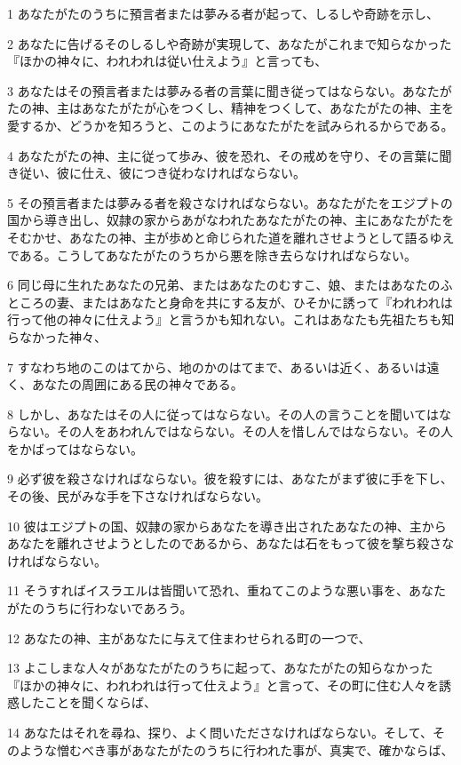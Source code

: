 \par 1 あなたがたのうちに預言者または夢みる者が起って、しるしや奇跡を示し、
\par 2 あなたに告げるそのしるしや奇跡が実現して、あなたがこれまで知らなかった『ほかの神々に、われわれは従い仕えよう』と言っても、
\par 3 あなたはその預言者または夢みる者の言葉に聞き従ってはならない。あなたがたの神、主はあなたがたが心をつくし、精神をつくして、あなたがたの神、主を愛するか、どうかを知ろうと、このようにあなたがたを試みられるからである。
\par 4 あなたがたの神、主に従って歩み、彼を恐れ、その戒めを守り、その言葉に聞き従い、彼に仕え、彼につき従わなければならない。
\par 5 その預言者または夢みる者を殺さなければならない。あなたがたをエジプトの国から導き出し、奴隷の家からあがなわれたあなたがたの神、主にあなたがたをそむかせ、あなたの神、主が歩めと命じられた道を離れさせようとして語るゆえである。こうしてあなたがたのうちから悪を除き去らなければならない。
\par 6 同じ母に生れたあなたの兄弟、またはあなたのむすこ、娘、またはあなたのふところの妻、またはあなたと身命を共にする友が、ひそかに誘って『われわれは行って他の神々に仕えよう』と言うかも知れない。これはあなたも先祖たちも知らなかった神々、
\par 7 すなわち地のこのはてから、地のかのはてまで、あるいは近く、あるいは遠く、あなたの周囲にある民の神々である。
\par 8 しかし、あなたはその人に従ってはならない。その人の言うことを聞いてはならない。その人をあわれんではならない。その人を惜しんではならない。その人をかばってはならない。
\par 9 必ず彼を殺さなければならない。彼を殺すには、あなたがまず彼に手を下し、その後、民がみな手を下さなければならない。
\par 10 彼はエジプトの国、奴隷の家からあなたを導き出されたあなたの神、主からあなたを離れさせようとしたのであるから、あなたは石をもって彼を撃ち殺さなければならない。
\par 11 そうすればイスラエルは皆聞いて恐れ、重ねてこのような悪い事を、あなたがたのうちに行わないであろう。
\par 12 あなたの神、主があなたに与えて住まわせられる町の一つで、
\par 13 よこしまな人々があなたがたのうちに起って、あなたがたの知らなかった『ほかの神々に、われわれは行って仕えよう』と言って、その町に住む人々を誘惑したことを聞くならば、
\par 14 あなたはそれを尋ね、探り、よく問いたださなければならない。そして、そのような憎むべき事があなたがたのうちに行われた事が、真実で、確かならば、
